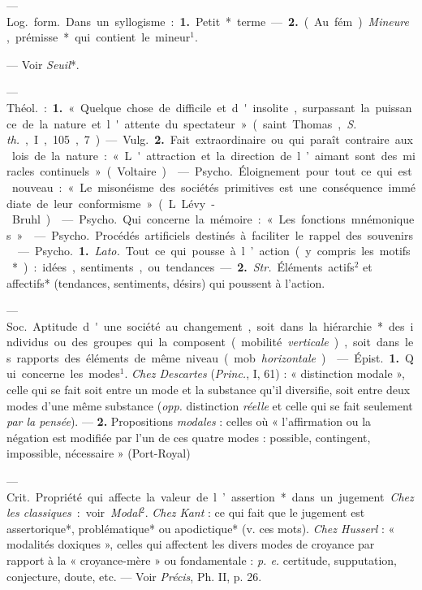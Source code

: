 \begin{itemize}[leftmargin=1cm, label=, itemsep=1pt]
 — \si{Log.} \si{form.} Dans un syllogisme : {\bf 1.} Petit*
terme. — {\bf 2.} (Au fém.). {\it Mineure}, prémisse* qui contient le
mineur$^1$.

 — Voir {\it Seuil}*.

 — \si{Théol.} : {\bf 1.} « Quelque chose de difficile et
d'insolite, surpassant la puissance de la nature et l'attente du
spectateur » (saint Thomas, {\it S. th.}, I, 105, 7). — \si{Vulg.} {\bf 2.}
Fait extraordinaire ou qui paraît contraire aux lois de la nature :
« L'attraction et la direction de l’aimant sont des miracles
continuels » (Voltaire).

 — \si{Psycho.} Éloignement pour tout ce qui est nouveau :
« Le misonéisme des sociétés primitives est une conséquence immédiate de leur
conformisme » (L. Lévy-Bruhl).

 — \si{Psycho.} Qui concerne la mémoire : « Les fonctions
mnémoniques. »

 — \si{Psycho.} Procédés artificiels destinés à faciliter le
rappel des souvenirs.

 — \si{Psycho.} {\bf 1.} {\it Lato.} Tout ce qui pousse à
l’action (y compris les motifs*) : idées, sentiments, ou tendances. —
{\bf 2.} {\it Str.} Éléments actifs$^2$ et affectifs* (tendances, sentiments,
désirs) qui poussent à l’action.

 — \si{Soc.} Aptitude d'une société au changement, soit
dans la hiérarchie* des individus ou des groupes qui la composent (mobilité
{\it verticale}), soit dans les rapports des éléments de même niveau (mob.
{\it horizontale}).

 — \si{Épist.} {\bf 1.} Qui concerne les modes$^1$. {\it Chez
Descartes} ({\it Princ.}, I, 61) : « distinction modale », celle qui se fait
soit entre un mode et la substance
qu'il diversifie, soit entre deux modes d’une même substance ({\it opp.}
distinction {\it réelle} et celle qui se fait seulement {\it par la pensée}).
—  {\bf 2.} Propositions {\it modales} : celles où « l'affirmation ou la
négation est modifiée par l'un de ces quatre modes : possible, contingent,
impossible, nécessaire » (Port-Royal)

 — \si{Crit.} Propriété qui affecte la valeur de l’assertion*
dans un jugement. {\it Chez les classiques} : voir {\it Modal}$^2$. {\it Chez
Kant} : ce qui fait que le jugement est assertorique*, problématique* ou
apodictique* (v. ces mots). {\it Chez Husserl} : « modalités doxiques »,
celles qui affectent les divers modes de croyance par rapport à la
« croyance-mère » ou fondamentale : {\it p. e.} certitude, supputation,
conjecture, doute, etc. — Voir {\it Précis}, Ph. II, p. 26.


\end{itemize}
